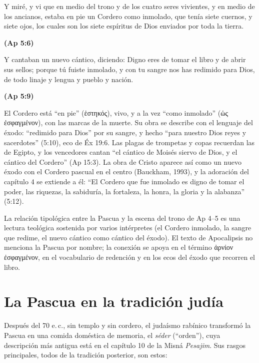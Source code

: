 \documentclass[11pt,letterpaper]{article}
\newcommand{\grc}[1]{\foreignlanguage{ancientgreek}{#1}}
\newcommand{\fuente}[1]{\par\hfill{\upshape\bfseries\small\textcolor{tierraroja}{#1}}}
\begin{document}
\begin{cita}Y miré, y vi que en medio del trono y de los cuatro seres vivientes, y en medio de los ancianos, estaba en pie un Cordero como inmolado, que tenía siete cuernos, y siete ojos, los cuales son los siete espíritus de Dios enviados por toda la tierra.\fuente{(Ap 5:6)}\end{cita}

\begin{cita}Y cantaban un nuevo cántico, diciendo: Digno eres de tomar el libro y de abrir sus sellos; porque tú fuiste inmolado, y con tu sangre nos has redimido para Dios, de todo linaje y lengua y pueblo y nación.\fuente{(Ap 5:9)}\end{cita}

El Cordero está ``en pie'' (\grc{ἑστηκός}), vivo, y a la vez ``como inmolado'' (\grc{ὡς ἐσφαγμένον}), con las marcas de la muerte. Su obra se describe con el lenguaje del éxodo: ``redimido para Dios'' por su sangre, y hecho ``para nuestro Dios reyes y sacerdotes'' (5:10), eco de Éx 19:6. Las plagas de trompetas y copas recuerdan las de Egipto, y los vencedores cantan ``el cántico de Moisés siervo de Dios, y el cántico del Cordero'' (Ap 15:3). La obra de Cristo aparece así como un nuevo éxodo con el Cordero pascual en el centro (Bauckham, 1993), y la adoración del capítulo 4 se extiende a él: ``El Cordero que fue inmolado es digno de tomar el poder, las riquezas, la sabiduría, la fortaleza, la honra, la gloria y la alabanza'' (5:12).

\begin{nota}[Precisión]
La relación tipológica entre la Pascua y la escena del trono de Ap 4--5 es una lectura teológica sostenida por varios intérpretes (el Cordero inmolado, la sangre que redime, el nuevo cántico como cántico del éxodo). El texto de Apocalipsis no menciona la Pascua por nombre; la conexión se apoya en el término \grc{ἀρνίον} \grc{ἐσφαγμένον}, en el vocabulario de redención y en los ecos del éxodo que recorren el libro.
\end{nota}

\section{La Pascua en la tradición judía}

Después del 70 e.\,c., sin templo y sin cordero, el judaísmo rabínico transformó la Pascua en una comida doméstica de memoria, el \emph{séder} (``orden''), cuya descripción más antigua está en el capítulo 10 de la Misná \emph{Pesajim}. Sus rasgos principales, todos de la tradición posterior, son estos:
\end{document}
